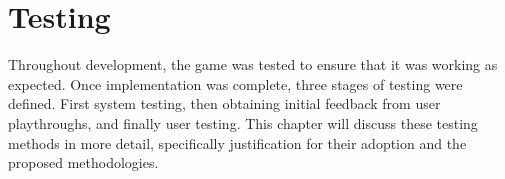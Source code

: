 \documentclass[a4paper,11.5pt]{report}
\numberwithin{figure}{section}
\numberwithin{table}{section}
\numberwithin{equation}{section}
\numberwithin{equation}{section}
\newcommand\blankpage{%
    \null
    \thispagestyle{empty}%
    \addtocounter{page}{-1}%
    \newpage}
\begin{document}














\afterpage{\blankpage}






\chapter{Testing}


Throughout development, the game was tested to ensure that it was working as expected. Once implementation was complete, three stages of testing were defined. First system testing, then obtaining initial feedback from user playthroughs, and finally user testing. This chapter will discuss these testing methods in more detail, specifically justification for their adoption and the proposed methodologies.


\end{document}
